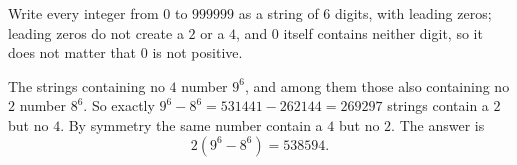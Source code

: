 Write every integer from $0$ to $999999$ as a string of $6$ digits, with leading zeros; leading zeros do not create a $2$ or a $4$, and $0$ itself contains neither digit, so it does not matter that $0$ is not positive.

The strings containing no $4$ number $9^6$, and among them those also containing no $2$ number $8^6$. So exactly $9^6-8^6=531441-262144=269297$ strings contain a $2$ but no $4$. By symmetry the same number contain a $4$ but no $2$. The answer is
\[
2\left(9^6-8^6\right)=\boxed{538594}.
\]
